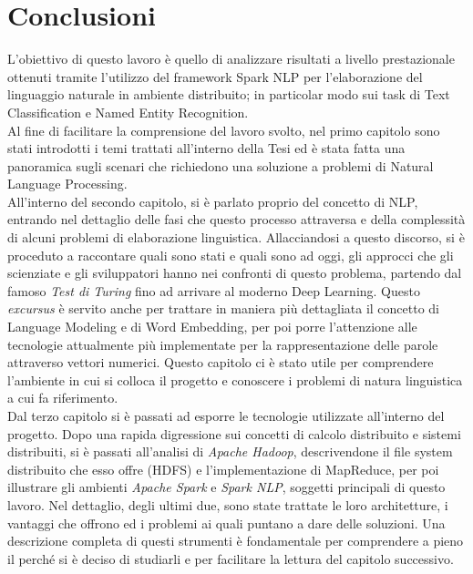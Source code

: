 \chapter{Conclusioni}
L'obiettivo di questo lavoro è quello di analizzare risultati a livello prestazionale ottenuti tramite l'utilizzo del framework Spark NLP per l'elaborazione del linguaggio naturale in ambiente distribuito; in particolar modo sui task di Text Classification e Named Entity Recognition.\\

Al fine di facilitare la comprensione del lavoro svolto, nel primo capitolo sono stati introdotti i temi trattati all'interno della Tesi ed è stata fatta una panoramica sugli scenari che richiedono una soluzione a problemi di Natural Language Processing.\\

All'interno del secondo capitolo, si è parlato proprio del concetto di NLP, entrando nel dettaglio delle fasi che questo processo attraversa e della complessità di alcuni problemi di elaborazione linguistica. Allacciandosi a questo discorso, si è proceduto a raccontare quali sono stati e quali sono ad oggi, gli approcci che gli scienziate e gli sviluppatori hanno nei confronti di questo problema, partendo dal famoso \textit{Test di Turing} fino ad arrivare al moderno Deep Learning. 
Questo \textit{excursus} è servito anche per trattare in maniera più dettagliata il concetto di Language Modeling e di Word Embedding, per poi porre l'attenzione alle tecnologie attualmente più implementate per la rappresentazione delle parole attraverso vettori numerici.
Questo capitolo ci è stato utile per comprendere l'ambiente in cui si colloca il progetto e conoscere i problemi di natura linguistica a cui fa riferimento.\\

Dal terzo capitolo si è passati ad esporre le tecnologie utilizzate all'interno del progetto. Dopo una rapida digressione sui concetti di calcolo distribuito e sistemi distribuiti, si è passati all'analisi di \textit{Apache Hadoop}, descrivendone il file system distribuito che esso offre (HDFS) e l'implementazione di MapReduce, per poi illustrare gli ambienti \textit{Apache Spark} e \textit{Spark NLP}, soggetti principali di questo lavoro. Nel dettaglio, degli ultimi due, sono state trattate le loro architetture, i vantaggi che offrono ed i problemi ai quali puntano a dare delle soluzioni. 
Una descrizione completa di questi strumenti è fondamentale per comprendere a pieno il perché si è deciso di studiarli e per facilitare la lettura del capitolo successivo.

